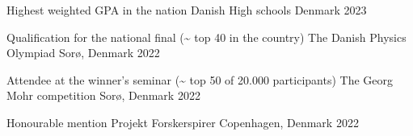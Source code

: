 
\begin{cvhonors}
  \cvhonor
    {Highest weighted GPA in the nation} %
    {Danish High schools} %
    {Denmark} %
    {2023} %

  \cvhonor
    {Qualification for the national final (\textasciitilde{} top 40 in the country)} %
    {The Danish Physics Olympiad} %
    {Sorø, Denmark} %
    {2022} %

  \cvhonor
    {Attendee at the winner's seminar (\textasciitilde{} top 50 of 20.000 participants)} %
    {The Georg Mohr competition} %
    {Sorø, Denmark} %
    {2022} %

  \cvhonor
    {Honourable mention}
    {Projekt Forskerspirer}
    {Copenhagen, Denmark}
    {2022}
\end{cvhonors}
